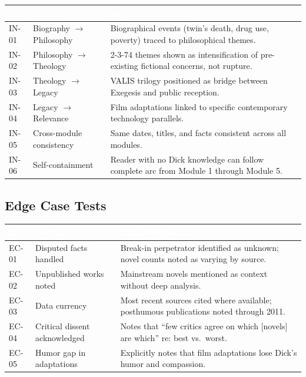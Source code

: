 \documentclass[11pt,letterpaper]{article}
\newcommand{\tableheader}[1]{\textbf{\sffamily\textcolor{white}{#1}}}
\begin{document}
\begin{center}
\begin{tabularx}{\textwidth}{C{1.2cm}L{3.5cm}X}
\toprule
{}
\tableheader{ID} & \tableheader{Verifies} & \tableheader{Expected Behavior} \\
\midrule
IN-01 & Biography $\rightarrow$ Philosophy & Biographical events (twin's death, drug use, poverty) traced to philosophical themes. \\
IN-02 & Philosophy $\rightarrow$ Theology & 2-3-74 themes shown as intensification of pre-existing fictional concerns, not rupture. \\
IN-03 & Theology $\rightarrow$ Legacy & VALIS trilogy positioned as bridge between Exegesis and public reception. \\
IN-04 & Legacy $\rightarrow$ Relevance & Film adaptations linked to specific contemporary technology parallels. \\
IN-05 & Cross-module consistency & Same dates, titles, and facts consistent across all modules. \\
IN-06 & Self-containment & Reader with no Dick knowledge can follow complete arc from Module 1 through Module 5. \\
\bottomrule
\end{tabularx}
\end{center}

\subsection{Edge Case Tests}

\begin{center}
\begin{tabularx}{\textwidth}{C{1.2cm}L{3.5cm}X}
\toprule
{}
\tableheader{ID} & \tableheader{Verifies} & \tableheader{Expected Behavior} \\
\midrule
EC-01 & Disputed facts handled & Break-in perpetrator identified as unknown; novel counts noted as varying by source. \\
EC-02 & Unpublished works noted & Mainstream novels mentioned as context without deep analysis. \\
EC-03 & Data currency & Most recent sources cited where available; posthumous publications noted through 2011. \\
EC-04 & Critical dissent acknowledged & Notes that ``few critics agree on which [novels] are which'' re: best vs.\ worst. \\
EC-05 & Humor gap in adaptations & Explicitly notes that film adaptations lose Dick's humor and compassion. \\
\bottomrule
\end{tabularx}
\end{center}
\end{document}
